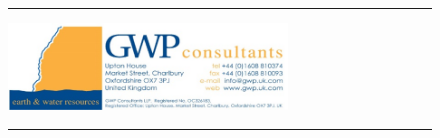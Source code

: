 \documentclass[12pt, letterpaper]{article}
\begin{document}
\begin{figure}[h]
{{\begin{minipage}[c][4.5cm][t]{1\textwidth}
\begin{minipage}[t][2cm][t]{0.5\textwidth}
                            	\end{minipage}
				\vrule
				\begin{minipage}[t][2cm][t]{0.5\textwidth} 
                                		\vspace{2mm}     
                                		\hspace{2mm}
                                    	\raggedright
                                		\text{\small{\textcolor[rgb]{0.1255,0.3058,0.4745}{Client:}} \\ 
                                		\hspace{6mm} \footnotesize{}} 
                                \end{minipage}
                                \hrule
                                \begin{minipage}[c][2.5cm][c]{0.5\textwidth} 
        					\centering
                				\includegraphics[height=2.3cm]{../logo/gwp.png}
            			\end{minipage}
				\vrule
				\begin{minipage}[c][2.5cm][c]{0.495\textwidth} 
        				\begin{minipage}[c][1.3cm][c]{1\textwidth} 
            				\vspace{2mm}
            				\hspace*{2mm}
            				\raggedright
            				\text{\small{\textcolor[rgb]{0.1255,0.3058,0.4745}{Project: }} \\ 
                				\hspace{6mm} \footnotesize{}}
        				\end{minipage}
        				\hrule
        				\begin{minipage}[c][1.2cm][t]{1\textwidth} 
            				\begin{minipage}[c][1.2cm][t]{0.7\textwidth}    
        						\vspace{1mm}
       						\hspace{2mm}
            					\raggedright
        						\text{\small{\textcolor[rgb]{0.1255,0.3058,0.4745}{Drawing No}} \\ 
        						\hspace{6mm} \footnotesize{}} 
        					\end{minipage}

\end{minipage}
\end{minipage}
\end{minipage}}}
\end{figure}
\end{document}
